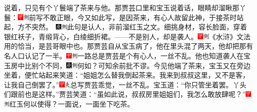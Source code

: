说着，只见有个丫鬟端了茶来与他。那贾芸口里和宝玉说着话，眼睛却溜瞅那丫鬟：{\includegraphics[width=3mm]{../Images/00002}\includegraphics[width=3mm]{../Images/00011}\footnotesize \kaishu 前写不敢正眼，今又如此写，是因茶来，有心人故留此神，于接茶时站起，方不突然。　\includegraphics[width=3mm]{../Images/00004}\includegraphics[width=3mm]{../Images/00011}\footnotesize \kaishu 此句是认人，非前溜红玉之文。}细挑身材，容长脸面，穿着银红袄子，青缎背心，白绫细折裙。------不是别人，却是袭人。{\includegraphics[width=3mm]{../Images/00002}\includegraphics[width=3mm]{../Images/00011}\footnotesize \kaishu 《水浒》文法用的恰当，是芸哥眼中也。}那贾芸自从宝玉病了，他在里头混了两天，他却把那有名人口认记了一半。{\includegraphics[width=3mm]{../Images/00002}\includegraphics[width=3mm]{../Images/00011}\footnotesize \kaishu 一路总是贾芸是个有心人，一丝不乱。}他也知道袭人在宝玉房中比别个不同，{\includegraphics[width=3mm]{../Images/00004}\includegraphics[width=3mm]{../Images/00011}\footnotesize \kaishu 何如？可知余前批不谬。}今见他端了茶来，宝玉又在旁边坐着，便忙站起来笑道：“姐姐怎么替我倒起茶来。我来到叔叔这里，又不是客，让我自己倒罢了。”{\includegraphics[width=3mm]{../Images/00002}\includegraphics[width=3mm]{../Images/00012}\footnotesize \kaishu 总写贾芸乖觉，一丝不乱。}宝玉道：“你只管坐着罢。丫头们跟前也是这样。”贾芸笑道：“虽如此说，叔叔房里姐姐们，我怎么敢放肆呢？”{\includegraphics[width=3mm]{../Images/00002}\includegraphics[width=3mm]{../Images/00011}\footnotesize \kaishu 红玉何以使得？}一面说，一面坐下吃茶。


